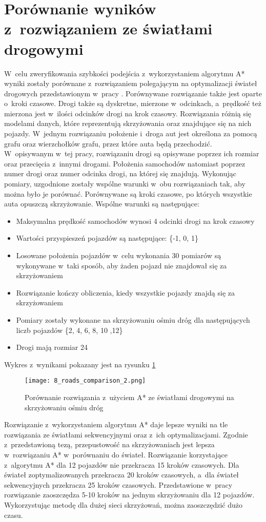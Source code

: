 \section{Porównanie wyników z~rozwiązaniem ze światłami drogowymi}

W~celu zweryfikowania szybkości podejścia z~wykorzystaniem algorytmu A* wyniki zostały porównane z~rozwiązaniem polegającym na optymalizacji świateł drogowych przedstawionym w~pracy \cite{slakomy}. Porównywane rozwiązanie także jest oparte o~kroki czasowe. Drogi także są dyskretne, mierzone w~odcinkach, a~prędkość też mierzona jest w~ilości odcinków drogi na krok czasowy.
\newline
\indent
Rozwiązania różnią się modelami danych, które reprezentują skrzyżowania oraz znajdujące się na nich pojazdy. W~jednym rozwiązaniu położenie i~droga aut jest określona za pomocą grafu oraz wierzchołków grafu, przez które auta będą przechodzić. W~opisywanym w~tej pracy, rozwiązaniu drogi są opisywane poprzez ich rozmiar oraz przecięcia z~innymi drogami. Położenia samochodów natomiast poprzez numer drogi oraz numer odcinka drogi, na której się znajdują.
\newline
\indent
Wykonując pomiary, uzgodnione zostały wspólne warunki w~obu rozwiązaniach tak, aby można było je porównać. Porównywane są kroki czasowe, po których wszystkie auta opuszczą skrzyżowanie. Wspólne warunki są następujące:
\begin{itemize}
\item Maksymalna prędkość samochodów wynosi 4 odcinki drogi na krok czasowy
\item Wartości przyspieszeń pojazdów są następujące: \{-1, 0, 1\}
\item Losowane położenia pojazdów w~celu wykonania 30 pomiarów są wykonywane w~taki sposób, aby żaden pojazd nie znajdował się za skrzyżowaniem
\item Rozwiązanie kończy obliczenia, kiedy wszystkie pojazdy znajdą się za skrzyżowaniem
\item Pomiary zostały wykonane na skrzyżowaniu ośmiu dróg dla następujących liczb pojazdów \{2, 4, 6, 8, 10 ,12\}
\item Drogi mają rozmiar 24
\end{itemize}
Wykres z~wynikami pokazany jest na rysunku \ref{comparison}
\begin{figure}[H]
  \texttt{[image: 8\_roads\_comparison\_2.png]}
  \caption{Porównanie rozwiązania z~użyciem A* ze światłami drogowymi na skrzyżowaniu ośmiu dróg}
  \label{comparison}
\end{figure}
Rozwiązanie z~wykorzystaniem algorytmu A* daje lepsze wyniki na tle rozwiązania ze światłami sekwencyjnymi oraz z~ich optymalizacjami. Zgodnie z~przedstawioną tezą, przepustowość na skrzyżowaniach jest lepsza w~rozwiązaniu A* w~porównaniu do świateł. Rozwiązanie korzystające z~algorytmu A* dla 12 pojazdów nie przekracza 15 kroków czasowych. Dla świateł zoptymalizowanych przekracza 20 kroków czasowych, a~dla świateł sekwencyjnych przekracza 25 kroków czasowych. Przedstawione w~pracy rozwiązanie zaoszczędza 5-10 kroków na jednym skrzyżowaniu dla 12 pojazdów. Wykorzystując metodę dla dużej sieci skrzyżowań, można zaoszczędzić dużo czasu.
